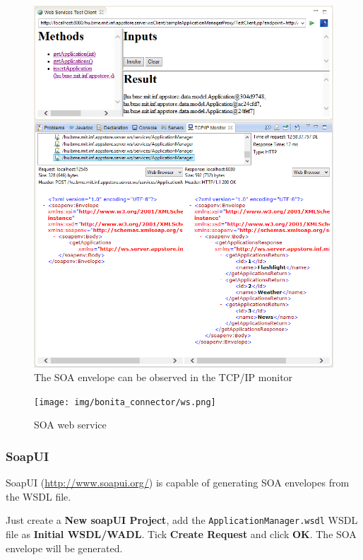 \documentclass[]{report}
\let\Oldincludegraphics\includegraphics
\renewcommand{\includegraphics}[1]{
\begin{adjustbox}{max size={\textwidth}{\textheight}}
    \Oldincludegraphics[scale=0.6]{#1}%
\end{adjustbox}
}
\begin{document}
\begin{figure}[htbp]
\centering
\includegraphics{img/web_services/tcp_ip_monitor_list.png}
\caption{The SOA envelope can be observed in the TCP/IP monitor}
\end{figure}

\begin{figure}[htbp]
\centering
\texttt{[image: img/bonita\_connector/ws.png]}
\caption{SOA web service}
\end{figure}

\subsubsection{SoapUI}

SoapUI (\url{http://www.soapui.org/}) is capable of generating SOA
envelopes from the WSDL file.

Just create a \textbf{New soapUI Project}, add the
\texttt{ApplicationManager.wsdl} WSDL file as \textbf{Initial
WSDL/WADL}. Tick \textbf{Create Request} and click \textbf{OK}. The SOA
envelope will be generated.
\end{document}
